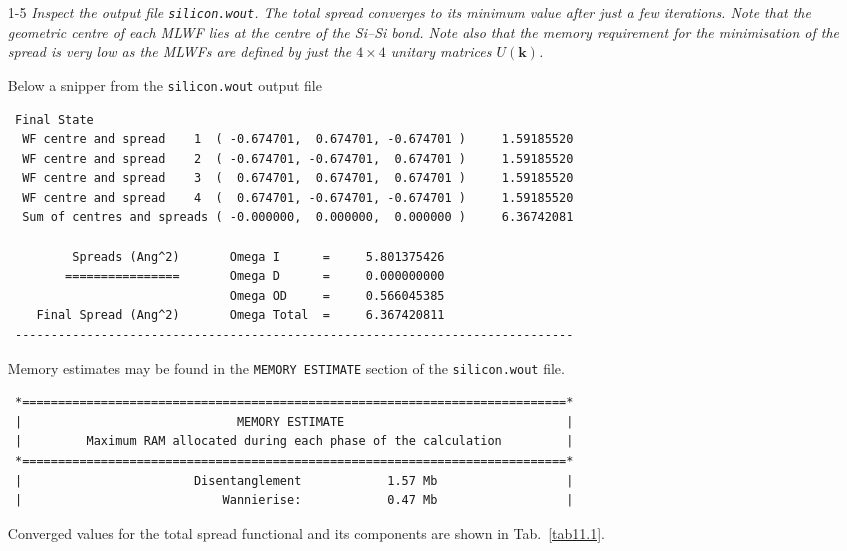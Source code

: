 \begin{itemize}
	\item[1-5] {\it Inspect the output file {\tt silicon.wout}. The total spread converges to its minimum value after just a
few iterations. Note that the geometric centre of each MLWF lies at the centre of the Si--Si bond. Note
also that the memory requirement for the minimisation of the spread is very low as the MLWFs are
defined by just the $4\times4$ unitary matrices $U(\mathbf{k})$.}

Below a snipper from the {\tt silicon.wout} output file
  \begin{tcolorbox}[sharp corners,boxrule=0.5pt]
  {\small
\begin{verbatim}
 Final State
  WF centre and spread    1  ( -0.674701,  0.674701, -0.674701 )     1.59185520
  WF centre and spread    2  ( -0.674701, -0.674701,  0.674701 )     1.59185520
  WF centre and spread    3  (  0.674701,  0.674701,  0.674701 )     1.59185520
  WF centre and spread    4  (  0.674701, -0.674701, -0.674701 )     1.59185520
  Sum of centres and spreads ( -0.000000,  0.000000,  0.000000 )     6.36742081

         Spreads (Ang^2)       Omega I      =     5.801375426
        ================       Omega D      =     0.000000000
                               Omega OD     =     0.566045385
    Final Spread (Ang^2)       Omega Total  =     6.367420811
 ------------------------------------------------------------------------------
\end{verbatim}
}
\end{tcolorbox}
Memory estimates may be found in the {\tt MEMORY ESTIMATE} section of the {\tt silicon.wout} file.
  \begin{tcolorbox}[sharp corners,boxrule=0.5pt]
  {\small
\begin{verbatim}
 *============================================================================*
 |                              MEMORY ESTIMATE                               |
 |         Maximum RAM allocated during each phase of the calculation         |
 *============================================================================*
 |                        Disentanglement            1.57 Mb                  |
 |                            Wannierise:            0.47 Mb                  |

\end{verbatim}
}
\end{tcolorbox}
Converged values for the total spread functional and its components are shown in Tab.~\ref{tab11.1}.


\end{itemize}
